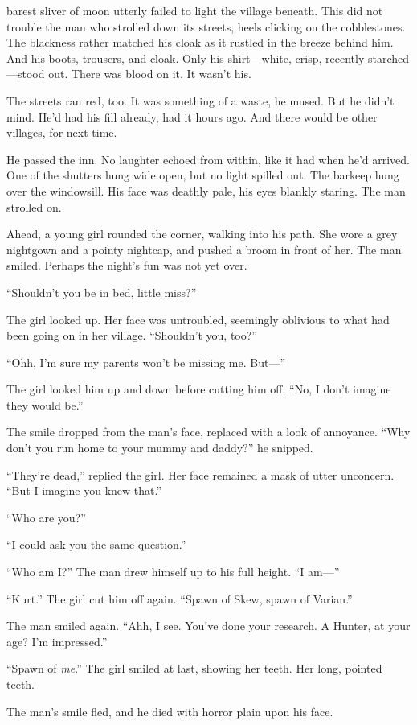 
 barest sliver of moon utterly failed to light the village beneath.
This did not trouble the man who strolled down its streets, heels clicking on the cobblestones.
The blackness rather matched his cloak as it rustled in the breeze behind him.
And his boots, trousers, and cloak.
Only his shirt---white, crisp, recently starched---stood out.
There was blood on it.
It wasn't his.


The streets ran red, too.
It was something of a waste, he mused.
But he didn't mind.
He'd had his fill already, had it hours ago.
And there would be other villages, for next time.

He passed the inn.
No laughter echoed from within, like it had when he'd arrived.
One of the shutters hung wide open, but no light spilled out.
The barkeep hung over the windowsill.
His face was deathly pale, his eyes blankly staring.
The man strolled on.

Ahead, a young girl rounded the corner, walking into his path.
She wore a grey nightgown and a pointy nightcap, and pushed a broom in front of her.
The man smiled.
Perhaps the night's fun was not yet over.

``Shouldn't you be in bed, little miss?''

The girl looked up.
Her face was untroubled, seemingly oblivious to what had been going on in her village.
``Shouldn't you, too?''

``Ohh, I'm sure my parents won't be missing me.
But---''

The girl looked him up and down before cutting him off.
``No, I don't imagine they would be.''

The smile dropped from the man's face, replaced with a look of annoyance.
``Why don't you run home to your mummy and daddy?'' he snipped.

``They're dead,'' replied the girl.
Her face remained a mask of utter unconcern.
``But I imagine you knew that.''

``Who are you?''

``I could ask you the same question.''

``Who am I?''
The man drew himself up to his full height.
``I am---''

``Kurt.''
The girl cut him off again.
``Spawn of Skew, spawn of Varian.''

The man smiled again.
``Ahh, I see.
You've done your research.
A Hunter, at your age?
I'm impressed.''

``Spawn of \emph{me}.''
The girl smiled at last, showing her teeth.
Her long, pointed teeth.

The man's smile fled, and he died with horror plain upon his face.
